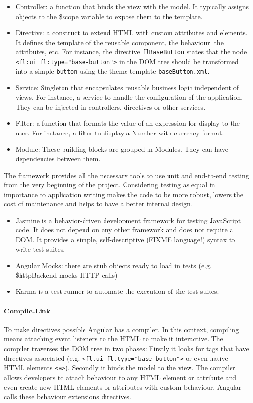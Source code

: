 \begin{itemize}
    \item Controller: a function that binds the view with the model. It typically assigns objects to the \$scope variable to expose them to the template.
    \item Directive: a construct to extend HTML with custom attributes and elements. It defines the template of the reusable component, the behaviour, the attributes, etc. For instance, the directive \texttt{flBaseButton} states that the node \lstinline$<fl:ui fl:type="base-button">$ in the \ac{DOM} tree should be transformed into a simple \texttt{button} using the theme template \texttt{baseButton.xml}. 
    \item Service: Singleton that encapsulates reusable business logic independent of views. For instance, a service to handle the configuration of the application. They can be injected in controllers, directives or other services.
    \item Filter: a function that formats the value of an expression for display to the user. For instance, a filter to display a Number with currency format.
    \item Module: These building blocks are grouped in Modules. They can have dependencies between them.
\end{itemize}

The framework provides all the necessary tools to use unit and end-to-end testing from the very beginning of the project.
Considering testing as equal in importance to application writing makes the code to be more robust, lowers the cost of maintenance and helps to have a better internal design.
\begin{itemize}
    \item Jasmine is a behavior-driven development framework for testing JavaScript code. It does not depend on any other framework and does not require a \ac{DOM}. It provides a simple, self-descriptive (FIXME language!) syntax to write test suites.
    \item Angular Mocks: there are stub objects ready to load in tests (e.g. \$httpBackend mocks \ac{HTTP} calls)
    \item Karma is a test runner to automate the execution of the test suites. 
\end{itemize}
    
\paragraph{Compile-Link} To make directives possible Angular has a compiler.
In this context, compiling means attaching event listeners to the \ac{HTML} to make it interactive.
The compiler traverses the \ac{DOM} tree in two phases:
Firstly it looks for tags that have directives associated (e.g. \lstinline$<fl:ui fl:type="base-button">$ or even native \ac{HTML} elements \lstinline$<a>$).
Secondly it binds the model to the view.
The compiler allows developers to attach behaviour to any \ac{HTML} element or attribute and even create new HTML elements or attributes with custom behaviour.
Angular calls these behaviour extensions directives.

